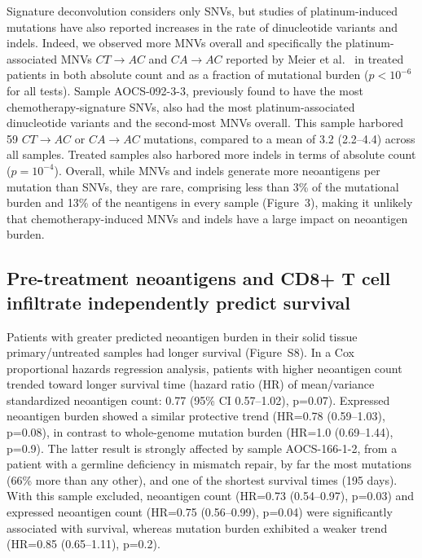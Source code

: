 \documentclass[linenumbers]{bmcart}
\begin{document}
Signature deconvolution considers only SNVs, but studies of platinum-induced mutations have also reported increases in the rate of dinucleotide variants and indels. Indeed, we observed more MNVs overall and specifically the platinum-associated MNVs $CT \rightarrow AC$ and $CA \rightarrow AC$ reported by Meier et al.~\cite{Meier_2014} in treated patients in both absolute count and as a fraction of mutational burden ($p < 10^{-6}$ for all tests). Sample AOCS-092-3-3, previously found to have the most chemotherapy-signature SNVs, also had the most platinum-associated dinucleotide variants and the second-most MNVs overall. This sample harbored 59 $CT \rightarrow AC$ or $CA \rightarrow AC$ mutations, compared to a mean of 3.2 (2.2--4.4) across all samples. Treated samples also harbored more indels in terms of absolute count ($p=10^{-4}$). Overall, while MNVs and indels generate more neoantigens per mutation than SNVs, they are rare, comprising less than 3\% of the mutational burden and 13\% of the neantigens in every sample (Figure~3), making it unlikely that chemotherapy-induced MNVs and indels have a large impact on neoantigen burden.

\subsection*{Pre-treatment neoantigens and CD8+ T cell infiltrate independently predict survival}



Patients with greater predicted neoantigen burden in their solid tissue primary/untreated samples had longer survival (Figure~S8). In a Cox proportional hazards regression analysis, patients with higher neoantigen count trended toward longer survival time (hazard ratio (HR) of mean/variance standardized neoantigen count: 0.77 (95\% CI 0.57--1.02), p=0.07). Expressed neoantigen burden showed a similar protective trend (HR=0.78 (0.59--1.03), p=0.08), in contrast to whole-genome mutation burden (HR=1.0 (0.69--1.44), p=0.9). The latter result is strongly affected by sample AOCS-166-1-2, from a patient with a germline deficiency in mismatch repair, by far the most mutations (66\% more than any other), and one of the shortest survival times (195 days). With this sample excluded, neoantigen count (HR=0.73 (0.54--0.97), p=0.03) and expressed neoantigen count (HR=0.75 (0.56--0.99), p=0.04) were significantly associated with survival, whereas mutation burden exhibited a weaker trend (HR=0.85 (0.65--1.11), p=0.2).
\end{document}
